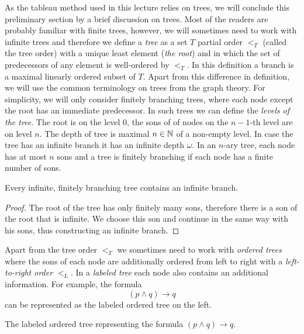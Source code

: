 As the tableau method used in this lecture relies on trees, we will conclude this preliminary section by a brief discussion on trees. Most of the readers are probably familiar with finite trees, however, we will sometimes need to work with infinite trees and therefore we define a \emph{tree} as a set $T$  partial order $<_T$ (called the tree order) with a unique least element (\emph{the root}) and in which the set of predecessors of any element is well-ordered by $<_T$. In this definition a branch is a maximal linearly ordered subset of $T$. Apart from this difference in definition, we will use the common terminology on trees from the graph theory. For simplicity, we will only consider finitely branching trees, where each node except the root has an immediate predecessor. In such trees we can define the \emph{levels of the tree}. The root is on the level 0, the sons of of nodes on the $n-1$-th level are on level $n$. The depth of tree is maximal $n \in \mathbb{N}$ of a non-empty level. In case the tree has an infinite branch it has an infinite depth $\omega$. In an $n$-ary tree, each node has at most $n$ sons and a tree is finitely branching if each node has a finite number of sons.

\begin{lemma}[König]
Every infinite, finitely branching tree contains an infinite branch.
\end{lemma}
\begin{proof}
The root of the tree has only finitely many sons, therefore there is a son of the root that is infinite. We choose this son and continue in the same way with his sons, thus constructing an infinite branch.
\end{proof}

Apart from the tree order $<_T$ we sometimes need to work with \emph{ordered trees} where the sons of each node are additionally ordered from left to right with a \emph{left-to-right order} $<_L$. In a \emph{labeled tree} each node also contains an additional information. For example, the formula $$(p \land q) \to q$$ can be represented as the labeled ordered tree on the left.

\begin{marginfigure}[-4\baselineskip]
\centering
{}
\caption{The labeled ordered tree representing the formula $(p \land q) \to q$.}
\end{marginfigure}